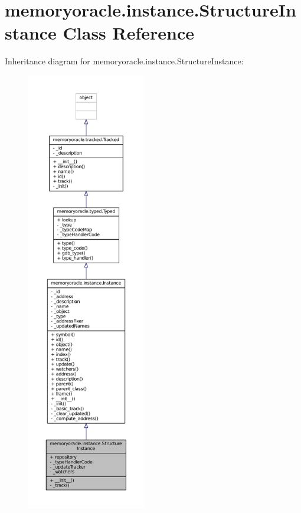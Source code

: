 \hypertarget{classmemoryoracle_1_1instance_1_1StructureInstance}{}\section{memoryoracle.\+instance.\+Structure\+Instance Class Reference}
\label{classmemoryoracle_1_1instance_1_1StructureInstance}


Inheritance diagram for memoryoracle.\+instance.\+Structure\+Instance\+:\nopagebreak
\begin{figure}[H]
\begin{center}
\leavevmode
\includegraphics[height=550pt]{classmemoryoracle_1_1instance_1_1StructureInstance__inherit__graph}
\end{center}
\end{figure}


